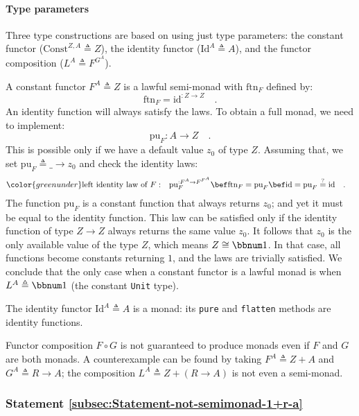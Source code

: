 \paragraph{Type parameters}

Three type constructions are based on using just type parameters:
the constant functor ($\text{Const}^{Z,A}\triangleq Z$), the identity
functor ($\text{Id}^{A}\triangleq A$), and the functor composition
($L^{A}\triangleq F^{G^{A}}$).

A constant functor $F^{A}\triangleq Z$ is a lawful semi-monad with
$\text{ftn}_{F}$ defined by:
\[
\text{ftn}_{F}=\text{id}^{:Z\rightarrow Z}\quad.
\]
An identity function will always satisfy the laws. To obtain a full
monad, we need to implement:
\[
\text{pu}_{F}:A\rightarrow Z\quad.
\]
This is possible only if we have a default value $z_{0}$ of type
$Z$. Assuming that, we set $\text{pu}_{F}\triangleq\_\rightarrow z_{0}$
and check the identity laws:
\begin{align*}
{\color{greenunder}\text{left identity law of }F:}\quad & \text{pu}_{F}^{:F^{A}\rightarrow F^{F^{A}}}\bef\text{ftn}_{F}=\text{pu}_{F}\bef\text{id}=\text{pu}_{F}\overset{?}{=}\text{id}\quad.
\end{align*}
The function $\text{pu}_{F}$ is a constant function that always returns
$z_{0}$; and yet it must be equal to the identity function. This
law can be satisfied only if the identity function of type $Z\rightarrow Z$
always returns the same value $z_{0}$. It follows that $z_{0}$ is
the only available value of the type $Z$, which means $Z\cong\bbnum 1$.
In that case, all functions become constants returning $1$, and the
laws are trivially satisfied. We conclude that the only case when
a constant functor is a lawful monad is when $L^{A}\triangleq\bbnum 1$
(the constant \lstinline!Unit! type).

The identity functor $\text{Id}^{A}\triangleq A$ is a monad: its
\lstinline!pure! and \lstinline!flatten! methods are identity functions.

Functor composition $F\circ G$ is not guaranteed to produce monads
even if $F$ and $G$ are both monads. A counterexample can be found
by taking $F^{A}\triangleq Z+A$ and $G^{A}\triangleq R\rightarrow A$;
the composition $L^{A}\triangleq Z+\left(R\rightarrow A\right)$ is
not even a semi-monad.

\subsubsection{Statement \label{subsec:Statement-not-semimonad-1+r-a}\ref{subsec:Statement-not-semimonad-1+r-a}}

